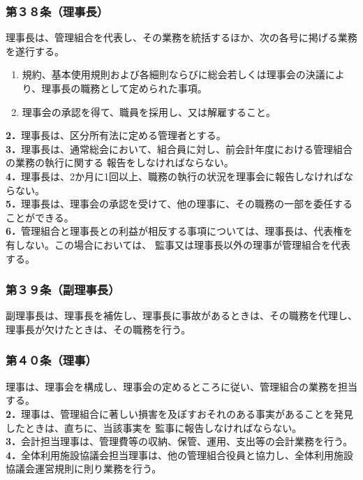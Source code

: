 \documentclass[
  luatex,
  paper=a4paper,
  fontsize=11pt,
  jafontsize=10pt,
  jlreq_notes,
]{jlreq}
\begin{document}
  \subsubsection*{第３８条（理事長）}
  理事長は、管理組合を代表し、その業務を統括するほか、次の各号に掲げる業務を遂行する。
  \begin{enumerate}
  \item 規約、基本使用規則および各細則ならびに総会若しくは理事会の決議により、理事長の職務として定められた事項。
  \item 理事会の承認を得て、職員を採用し、又は解雇すること。
  \end{enumerate}
  \textbf{2．}理事長は、区分所有法に定める管理者とする。\\
  \textbf{3．}理事長は、通常総会において、組合員に対し、前会計年度における管理組合の業務の執行に関する
  報告をしなければならない。\\
  \textbf{4．}理事長は、2か月に1回以上、職務の執行の状況を理事会に報告しなければならない。\\
  \textbf{5．}理事長は、理事会の承認を受けて、他の理事に、その職務の一部を委任することができる。\\
  \textbf{6．}管理組合と理事長との利益が相反する事項については、理事長は、代表権を有しない。この場合においては、
  監事又は理事長以外の理事が管理組合を代表する。
  \subsubsection*{第３９条（副理事長）}
  副理事長は、理事長を補佐し、理事長に事故があるときは、その職務を代理し、理事長が欠けたときは、その職務を行う。
  \subsubsection*{第４０条（理事）}
  理事は、理事会を構成し、理事会の定めるところに従い、管理組合の業務を担当する。\\
  \textbf{2．}理事は、管理組合に著しい損害を及ぼすおそれのある事実があることを発見したときは、直ちに、当該事実を
  監事に報告しなければならない。\\
  \textbf{3．}会計担当理事は、管理費等の収納、保管、運用、支出等の会計業務を行う。\\
  \textbf{4．}全体利用施設協議会担当理事は、他の管理組合役員と協力し、全体利用施設協議会運営規則に則り業務を行う。
\end{document}
